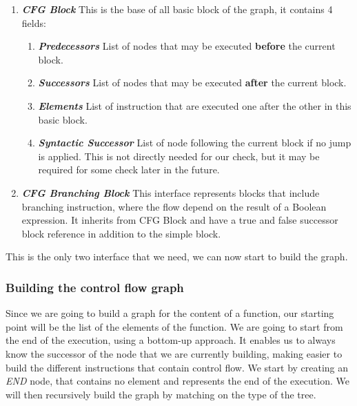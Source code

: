 \begin{enumerate}
	\item \textbf{\textit{CFG Block}} \newline 
	This is the base of all basic block of the graph, it contains 4 fields:
	\begin{enumerate}
		\item \textbf{\textit{Predecessors}} \newline
		List of nodes that may be executed \textbf{before} the current block.\newline
		\item \textbf{\textit{Successors}} \newline
		List of nodes that may be executed \textbf{after} the current block.\newline
		\item \textbf{\textit{Elements}} \newline
		List of instruction that are executed one after the other in this basic block. \newline
		\item \textbf{\textit{Syntactic Successor}} \newline
		List of node following the current block if no jump is applied. 
		This is not directly needed for our check, but it may be required for some check later in the future.\newline
	\end{enumerate}
	\item \textbf{\textit{CFG Branching Block}} \newline 
	This interface represents blocks that include branching instruction, where the flow depend on the result of a Boolean expression. 
	It inherits from CFG Block and have a true and false successor block reference in addition to the simple block.
	\newline 
\end{enumerate}
This is the only two interface that we need, we can now start to build the graph.

\subsubsection{Building the control flow graph}
\label{subsubsec:building_the_graph}
Since we are going to build a graph for the content of a function, our starting point will be the list of the elements of the function.
We are going to start from the end of the execution, using a bottom-up approach.
It enables us to always know the successor of the node that we are currently building, making easier to build the different instructions that contain control flow.
We start by creating an \emph{END} node, that contains no element and represents the end of the execution.
We will then recursively build the graph by matching on the type of the tree.

